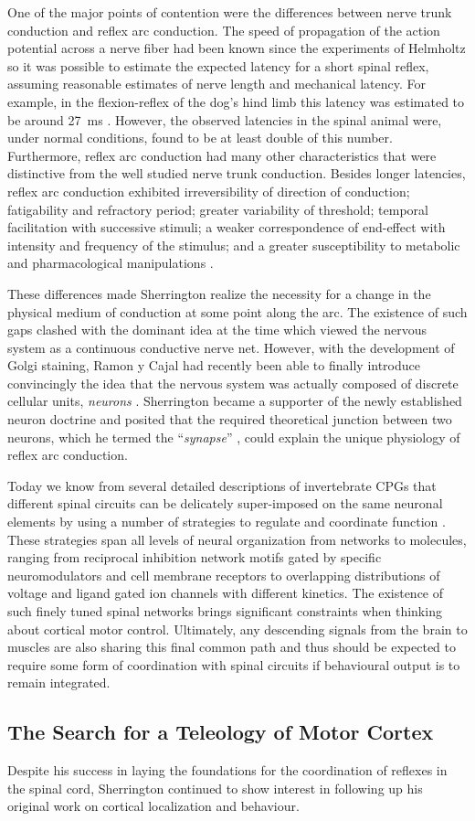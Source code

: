 One of the major points of contention were the differences between nerve trunk conduction and reflex arc conduction. The speed of propagation of the action potential across a nerve fiber had been known since the experiments of Helmholtz \cite{Helmholtz1850,Schmidgen2002} so it was possible to estimate the expected latency for a short spinal reflex, assuming reasonable estimates of nerve length and mechanical latency. For example, in the flexion-reflex of the dog's hind limb this latency was estimated to be around \SI{27}{\milli\second} \cite[p.19]{Sherrington1906}. However, the observed latencies in the spinal animal were, under normal conditions, found to be at least double of this number. Furthermore, reflex arc conduction had many other characteristics that were distinctive from the well studied nerve trunk conduction. Besides longer latencies, reflex arc conduction exhibited irreversibility of direction of conduction; fatigability and refractory period; greater variability of threshold; temporal facilitation with successive stimuli; a weaker correspondence of end-effect with intensity and frequency of the stimulus; and a greater susceptibility to metabolic and pharmacological manipulations \cite[p.14]{Sherrington1906}.

These differences made Sherrington realize the necessity for a change in the physical medium of conduction at some point along the arc. The existence of such gaps clashed with the dominant idea at the time which viewed the nervous system as a continuous conductive nerve net. However, with the development of Golgi staining, Ramon y Cajal had recently been able to finally introduce convincingly the idea that the nervous system was actually composed of discrete cellular units, \emph{neurons} \cite{RamonYCajal1894}. Sherrington became a supporter of the newly established neuron doctrine and posited that the required theoretical junction between two neurons, which he termed the ``\emph{synapse}'' \cite{Foster1897}, could explain the unique physiology of reflex arc conduction.

Today we know from several detailed descriptions of invertebrate CPGs that different spinal circuits can be delicately super-imposed on the same neuronal elements by using a number of strategies to regulate and coordinate function \cite{Orlovsky1999,Selverston2010}. These strategies span all levels of neural organization from networks to molecules, ranging from reciprocal inhibition network motifs gated by specific neuromodulators and cell membrane receptors to overlapping distributions of voltage and ligand gated ion channels with different kinetics. The existence of such finely tuned spinal networks brings significant constraints when thinking about cortical motor control. Ultimately, any descending signals from the brain to muscles are also sharing this final common path and thus should be expected to require some form of coordination with spinal circuits if behavioural output is to remain integrated.

\subsection{The Search for a Teleology of Motor Cortex}

Despite his success in laying the foundations for the coordination of reflexes in the spinal cord, Sherrington continued to show interest in following up his original work on cortical localization and behaviour.